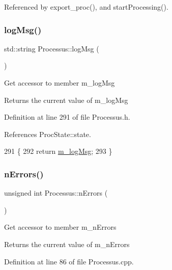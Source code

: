 Referenced by export\+\_\+proc(), and start\+Processing().

\mbox{\label{classProcessus_a42fdeb17dc13ba854222666b6aa29b61}} 
\subsubsection{\texorpdfstring{log\+Msg()}{logMsg()}}
{\footnotesize\ttfamily std\+::string Processus\+::log\+Msg (\begin{DoxyParamCaption}{ }\end{DoxyParamCaption})\hspace{0.3cm}{\ttfamily [inline]}}

Get accessor to member m\+\_\+log\+Msg \begin{DoxyReturn}{Returns}
the current value of m\+\_\+log\+Msg 
\end{DoxyReturn}


Definition at line 291 of file Processus.\+h.



References Proc\+State\+::state.


\begin{DoxyCode}
291                       \{
292     \textcolor{keywordflow}{return} \hyperlink{classProcessus_a3bc0140a3a69a83951ab7f9986bd2c84}{m\_logMsg};
293   \}
\end{DoxyCode}
\mbox{\label{classProcessus_a82a0487f82f07cc2c2dc2731f98149e7}} 
\subsubsection{\texorpdfstring{n\+Errors()}{nErrors()}}
{\footnotesize\ttfamily unsigned int Processus\+::n\+Errors (\begin{DoxyParamCaption}{ }\end{DoxyParamCaption})}

Get accessor to member m\+\_\+n\+Errors \begin{DoxyReturn}{Returns}
the current value of m\+\_\+n\+Errors 
\end{DoxyReturn}


Definition at line 86 of file Processus.\+cpp.



